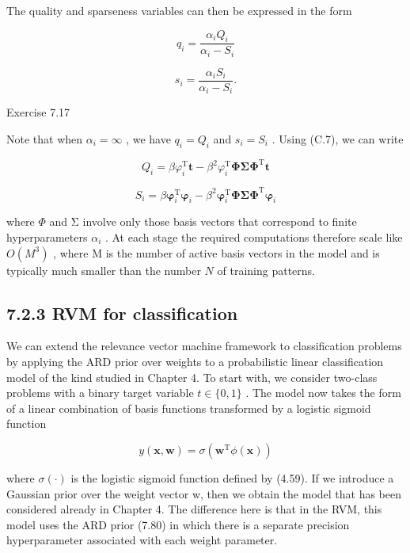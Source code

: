 \documentclass[
  10
]{article}
\begin{document}
The quality and sparseness variables can then be expressed in the form

\[
{q _ {i}} = {\frac {\alpha_ {i} Q _ {i}}{\alpha_ {i} - S _ {i}}}\tag{7.104}
\]

\[
s _ {i} = \frac {\alpha_ {i} S _ {i}}{\alpha_ {i} - S _ {i}}.\tag{7.105}
\]

Exercise 7.17

Note that when \(\alpha _ { i } = \infty\) , we have
\(q _ { i } = Q _ { i }\) and \(s _ { i } = S _ { i }\) . Using (C.7),
we can write

\[
{Q _ {i}} = {\beta \varphi_ {i} ^ {\mathrm{T}} \mathbf {t} - \beta^ {2} \varphi_ {i} ^ {\mathrm{T}} \boldsymbol {\Phi} \boldsymbol {\Sigma} \boldsymbol {\Phi} ^ {\mathrm{T}} \mathbf {t}}\tag{7.106}
\]

\[
{S _ {i}} = {\beta \pmb {\varphi} _ {i} ^ {\mathrm{T}} \pmb {\varphi} _ {i} - \beta^ {2} \pmb {\varphi} _ {i} ^ {\mathrm{T}} \pmb {\Phi} \pmb {\Sigma} \pmb {\Phi} ^ {\mathrm{T}} \pmb {\varphi} _ {i}}\tag{7.107}
\]

where \(\Phi\) and Σ involve only those basis vectors that correspond to
finite hyperparameters \(\alpha _ { i }\) . At each stage the required
computations therefore scale like \(O ( M ^ { 3 } )\) , where M is the
number of active basis vectors in the model and is typically much
smaller than the number \(N\) of training patterns.

\subsection{7.2.3 RVM for classification}\label{rvm-for-classification}

We can extend the relevance vector machine framework to classification
problems by applying the ARD prior over weights to a probabilistic
linear classification model of the kind studied in Chapter 4. To start
with, we consider two-class problems with a binary target variable
\(t \in \{ 0 , 1 \}\) . The model now takes the form of a linear
combination of basis functions transformed by a logistic sigmoid
function

\[
y (\mathbf {x}, \mathbf {w}) = \sigma \left(\mathbf {w} ^ {\mathrm{T}} \phi (\mathbf {x})\right)\tag{7.108}
\]

where \(\sigma ( \cdot )\) is the logistic sigmoid function defined by
(4.59). If we introduce a Gaussian prior over the weight vector w, then
we obtain the model that has been considered already in Chapter 4. The
difference here is that in the RVM, this model uses the ARD prior (7.80)
in which there is a separate precision hyperparameter associated with
each weight parameter.
\end{document}
